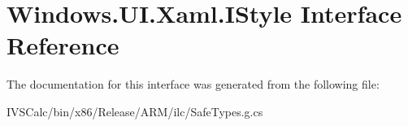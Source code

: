 \hypertarget{interface_windows_1_1_u_i_1_1_xaml_1_1_i_style}{}\section{Windows.\+U\+I.\+Xaml.\+I\+Style Interface Reference}
\label{interface_windows_1_1_u_i_1_1_xaml_1_1_i_style}


The documentation for this interface was generated from the following file\+:\begin{DoxyCompactItemize}
\item 
I\+V\+S\+Calc/bin/x86/\+Release/\+A\+R\+M/ilc/Safe\+Types.\+g.\+cs\end{DoxyCompactItemize}
